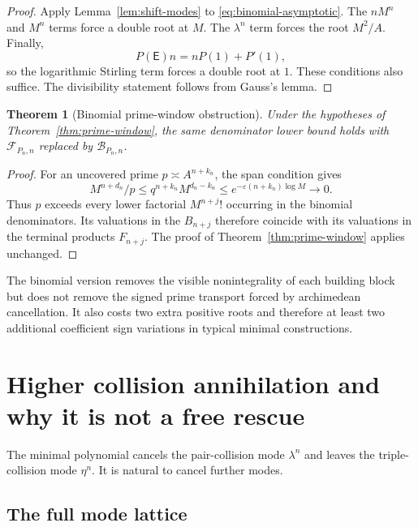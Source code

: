 \documentclass[11pt,oneside]{article}
\newtheorem{theorem}{Theorem}[section]
\theoremstyle{definition}
\theoremstyle{remark}
\newcommand{\EF}{\mathsf E}
\newcommand{\cF}{\mathcal F}
\newcommand{\cB}{\mathcal B}
\begin{document}
\begin{proof}
Apply Lemma~\ref{lem:shift-modes} to
\eqref{eq:binomial-asymptotic}.  The $nM^n$ and $M^n$ terms force a double root at $M$.
The $\lambda^n$ term forces the root $M^2/A$.  Finally,
\[
 P(\EF)n=nP(1)+P'(1),
\]
so the logarithmic Stirling term forces a double root at $1$.  These conditions also suffice.
The divisibility statement follows from Gauss's lemma.
\end{proof}

\begin{theorem}[Binomial prime-window obstruction]
\label{thm:binomial-window}
Under the hypotheses of Theorem~\ref{thm:prime-window}, the same denominator lower bound
holds with $\cF_{P_n,n}$ replaced by $\cB_{P_n,n}$.
\end{theorem}

\begin{proof}
For an uncovered prime $p\asymp A^{n+k_n}$, the span condition gives
\[
 M^{n+d_n}/p
 \le q^{n+k_n}M^{d_n-k_n}
 \le e^{-\varepsilon(n+k_n)\log M}\to0.
\]
Thus $p$ exceeds every lower factorial $M^{n+j}!$ occurring in the binomial denominators.
Its valuations in the $B_{n+j}$ therefore coincide with its valuations in the terminal
products $F_{n+j}$.  The proof of Theorem~\ref{thm:prime-window} applies unchanged.
\end{proof}

The binomial version removes the visible nonintegrality of each building block but does not
remove the signed prime transport forced by archimedean cancellation.  It also costs two
extra positive roots and therefore at least two additional coefficient sign variations in
typical minimal constructions.

\section{Higher collision annihilation and why it is not a free rescue}
\label{sec:higher-collision}

The minimal polynomial cancels the pair-collision mode $\lambda^n$ and leaves the
triple-collision mode $\eta^n$.  It is natural to cancel further modes.

\subsection{The full mode lattice}
\end{document}
